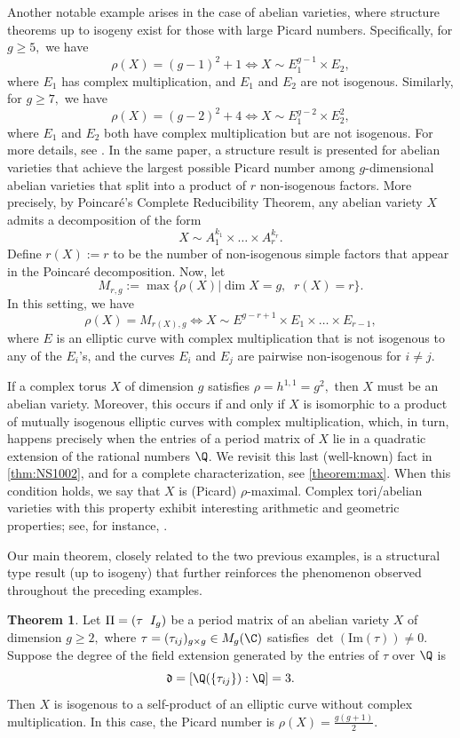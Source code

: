 \documentclass[11pt,leqno]{article}
\theoremstyle{definition}
\newtheorem{theorem}{Theorem}[section]
\begin{document}
Another notable example arises in the case of abelian varieties, where structure theorems up to isogeny exist for those with large Picard numbers. Specifically, for $g\geq 5,$ we have 
$$
\rho(X)=(g-1)^2+1\Longleftrightarrow X\sim E_1^{g-1}\times E_2,$$ 
where $E_1$ has complex multiplication, and $E_1$ and $E_2$ are not isogenous. Similarly, for $g\geq 7,$ we have 
$$
\rho(X)=(g-2)^2+4 \Longleftrightarrow X\sim E_1^{g-2}\times E_2^2,$$ 
where $E_1$ and $E_2$ both have complex multiplication but are not isogenous. For more details, see \cite{hulek2019picard}. In the same paper, a structure result is presented for abelian varieties that achieve the largest possible Picard number among $g$-dimensional abelian varieties that split into a product of $r$ non-isogenous factors. More precisely, by Poincaré's Complete Reducibility Theorem, any abelian variety $X$ admits a decomposition of the form 
$$
X\sim A_1^{k_1}\times\dots\times A_r^{k_r}.
$$
Define $r(X):=r$ to be the number of non-isogenous simple factors that appear in the Poincaré decomposition. Now, let
$$
M_{r,g}:=\max \{\rho(X)|\dim X=g,\;\;r(X)=r\}.
$$
In this setting, we have
$$
\rho(X)=M_{r(X),g}\Longleftrightarrow X\sim E^{g-r+1}\times E_1\times\dots\times E_{r-1}, 
$$
where $E$ is an elliptic curve with complex multiplication that is not isogenous to any of the $E_i$'s, and the curves $E_i$ and $E_j$ are pairwise non-isogenous for $i\neq j.$

If a complex torus $X$ of dimension $g$ satisfies $\rho=h^{1,1}=g^2,$ then $X$ must be an abelian variety. Moreover, this occurs if and only if $X$ is isomorphic to a product of mutually isogenous elliptic curves with complex multiplication, which, in turn, happens precisely when the entries of a period matrix of $X$ lie in a quadratic extension of the rational numbers $\Q$. We revisit this last (well-known) fact in \cref{thm:NS1002}, and for a complete characterization, see \cref{theorem:max}. When this condition holds, we say that $X$ is (Picard) $\rho$-maximal. Complex tori/abelian varieties with this property exhibit interesting arithmetic and geometric properties; see, for instance, \cite{beauville2014some, shioda1977singular, shioda1974singular}. 

Our main theorem, closely related to the two previous examples, is a structural type result (up to isogeny) that further reinforces the phenomenon observed throughout the preceding examples.

\begin{theorem}
\label{thm:main}
Let $\Pi=(\tau\hspace{0.2cm}I_g)$ be a period matrix of an abelian variety $X$ of dimension $g\geq 2,$ where $\tau=(\tau_{ij})_{g\times g}\in M_g(\C)$ satisfies $\det(\mathrm{Im}(\tau))\neq0.$ Suppose the degree of the field extension generated by the entries of $\tau$ over $\Q$ is 
$$\mathfrak{d}=[\Q(\{\tau_{ij}\}):\Q]=3.$$ 
Then $X$ is isogenous to a self-product of an elliptic curve without complex multiplication. In this case, the Picard number is $\rho(X)=\frac{g(g+1)}{2}.$ 
\end{theorem}
\end{document}
